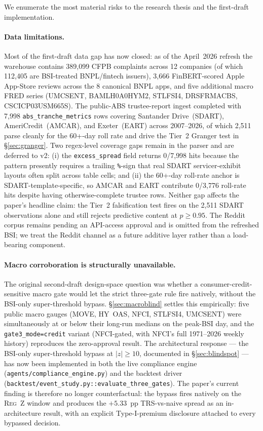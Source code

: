 \documentclass[11pt,letterpaper]{article}
\begin{document}
We enumerate the most material risks to the research thesis and the
first-draft implementation.

\paragraph{Data limitations.}
Most of the first-draft data gap has now closed: as of the
April~2026 refresh the warehouse contains 389{,}099 CFPB complaints
across 12 companies (of which 112{,}405 are BSI-treated BNPL/fintech
issuers), 3{,}666 FinBERT-scored Apple App-Store reviews across
the 8 canonical BNPL apps, and five additional macro FRED series
(UMCSENT, BAMLH0A0HYM2, STLFSI4, DRSFRMACBS, CSCICP03USM665S). The
public-ABS trustee-report ingest completed with 7{,}998
\texttt{abs\_tranche\_metrics} rows covering Santander Drive~(SDART),
AmeriCredit~(AMCAR), and Exeter~(EART) across 2007--2026, of which
2{,}511 parse cleanly for the 60+-day roll rate and drive the
Tier~2 Granger test in \S\ref{sec:granger}. Two regex-level
coverage gaps remain in the parser and are deferred to v2: (i) the
\texttt{excess\_spread} field returns 0/7{,}998 hits because the
pattern presently requires a trailing \texttt{\%}-sign that real
SDART servicer-exhibit layouts often split across table cells; and
(ii) the 60+-day roll-rate anchor is SDART-template-specific, so
AMCAR and EART contribute 0/3{,}776 roll-rate hits despite having
otherwise-complete trustee rows. Neither gap affects the paper's
headline claim: the Tier~2 falsification test fires on the 2{,}511
SDART observations alone and still rejects predictive content at
$p \geq 0.95$. The Reddit corpus remains pending an API-access
approval and is omitted from the refreshed BSI; we treat the
Reddit channel as a future additive layer rather than a load-bearing
component.

\paragraph{Macro corroboration is structurally unavailable.}
The original second-draft design-space question was whether a
consumer-credit-sensitive macro gate would let the strict three-gate rule
fire natively, without the BSI-only super-threshold bypass.
\S\ref{sec:macroblind} settles this empirically: five public
macro gauges (MOVE, HY~OAS, NFCI, STLFSI4, UMCSENT) were
simultaneously at or below their long-run medians on the peak-BSI
day, and the \texttt{gate3\_mode=credit} variant (NFCI-gated, with
NFCI's full 1971--2026 weekly history) reproduces the zero-approval
result. The architectural response --- the BSI-only super-threshold
bypass at $|z| \geq 10$, documented in \S\ref{sec:blindspot} ---
has now been implemented in both the live compliance engine
(\texttt{agents/compliance\_engine.py}) and the backtest driver
(\texttt{backtest/event\_study.py::evaluate\_three\_gates}). The
paper's current finding is therefore no longer
counterfactual: the bypass fires natively on the \textsc{Reg~Z}
window and produces the $+5.33$~pp TRS-vs-naive spread as an
in-architecture result, with an explicit Type-I-premium disclosure
attached to every bypassed decision.
\end{document}
